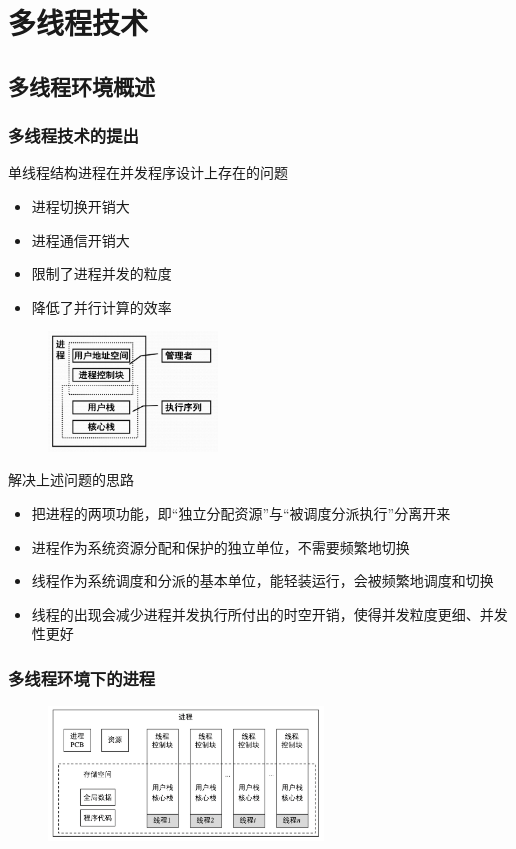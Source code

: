 \documentclass[cs4size,a4paper,10pt]{ctexart}
\begin{document}
	\section{多线程技术}
	\subsection{多线程环境概述}
	\subsubsection{多线程技术的提出}
	单线程结构进程在并发程序设计上存在的问题
	\begin{itemize}
		\item 进程切换开销大
		\item 进程通信开销大
		\item 限制了进程并发的粒度
		\item 降低了并行计算的效率
	\end{itemize}
	\begin{figure}[H]
		\centering
		\includegraphics[width=0.4\textwidth]{img/2.4.1.1}
	\end{figure}

	解决上述问题的思路
	\begin{itemize}
		\item 把进程的两项功能，即“独立分配资源”与“被调度分派执行”分离开来
		\item 进程作为系统资源分配和保护的独立单位，不需要频繁地切换
		\item 线程作为系统调度和分派的基本单位，能轻装运行，会被频繁地调度和切换
		\item 线程的出现会减少进程并发执行所付出的时空开销，使得并发粒度更细、并发性更好
	\end{itemize}


	\subsubsection{多线程环境下的进程}
	\begin{figure}[H]
		\centering
		\includegraphics[width=0.65\textwidth]{img/2.4.1.2}
	\end{figure}
\end{document}
